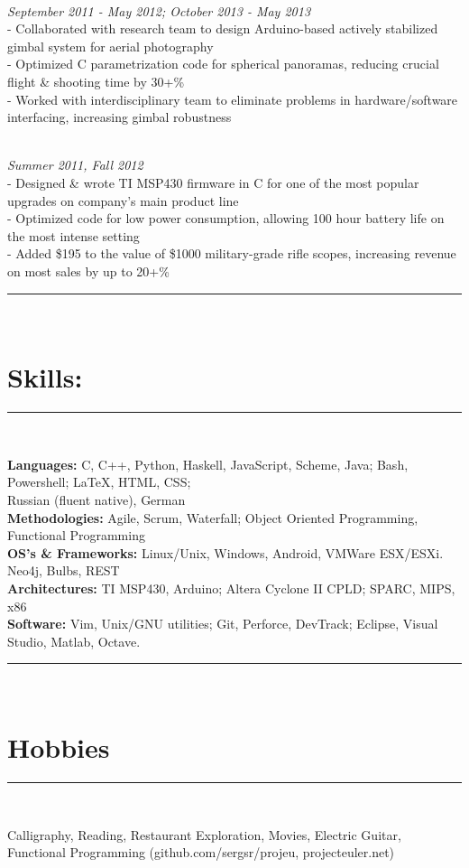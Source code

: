 \documentclass{article}
\newcommand{\sline}{\noindent\rule{575pt}{0.5pt}}
\begin{document}
\begin{spacing}{1.0}
 \\
\hfill {\sl September 2011 - May 2012; October 2013 - May 2013} \\
\indent \indent - Collaborated with research team to design Arduino-based
                  actively stabilized gimbal system for aerial photography\\
\indent \indent - Optimized C parametrization code for spherical panoramas,
                  reducing crucial flight \& shooting time by 30+\% \\
\indent \indent - Worked with interdisciplinary team to eliminate problems in
                  hardware/software interfacing, increasing gimbal robustness
\end{spacing}

\begin{spacing}{1.0}
 \\
\hfill {\sl Summer 2011, Fall 2012} \\
\indent \indent - Designed \& wrote TI MSP430 firmware in C for one of the most
                  popular upgrades on company's main product line \\
\indent \indent - Optimized code for low power consumption, allowing 100 hour
                  battery life on the most intense setting\\
\indent \indent - Added \$195 to the value of \$1000 military-grade rifle
                  scopes, increasing revenue on most sales by up to 20+\%
\end{spacing}

\sline \\
\section*{Skills:}
\sline \\
\begin{spacing}{1.0}
\noindent\textbf{Languages:}
C, C++, Python, Haskell, JavaScript, Scheme, Java; Bash, Powershell;
\LaTeX, HTML, CSS; \\
\indent \hspace{41pt} Russian (fluent native), German \\
\textbf{Methodologies:}
Agile, Scrum, Waterfall; Object Oriented Programming, Functional Programming \\
\textbf{OS's \& Frameworks:}
Linux/Unix, Windows, Android, VMWare ESX/ESXi. Neo4j, Bulbs, REST\\
\textbf{Architectures:}
TI MSP430, Arduino; Altera
Cyclone II CPLD; SPARC, MIPS, x86 \\
\textbf{Software:}
Vim, Unix/GNU utilities; Git, Perforce, DevTrack; Eclipse, Visual Studio,
Matlab, Octave.
\end{spacing}

\sline \\
\section*{Hobbies}
\sline \\
\begin{spacing}{1.0}
\indent Calligraphy, Reading, Restaurant Exploration, Movies, Electric Guitar,\\
\indent Functional Programming (github.com/sergsr/projeu, projecteuler.net)
\end{spacing}
\end{document}
